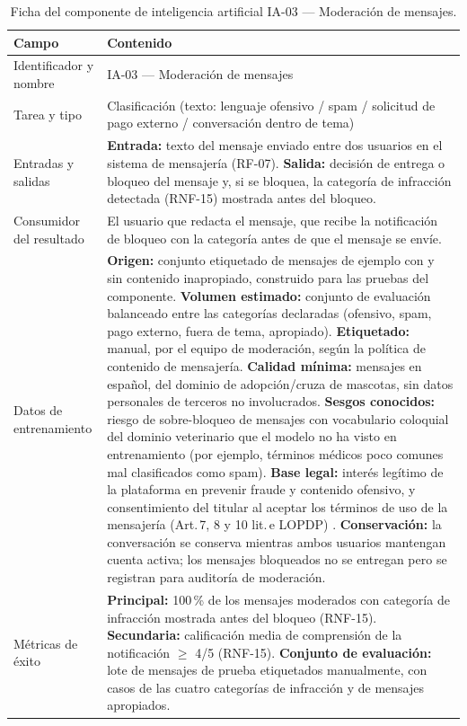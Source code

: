 \documentclass[journal,onecolumn]{IEEEtran}
\begin{document}
\begin{table}[H]
	\caption{Ficha del componente de inteligencia artificial IA-03 --- Moderación de mensajes.}
	\label{tab:ficha_ia03}
	\small
	\begin{tabularx}{\textwidth}{|L{4.2cm}|X|}
		\hline
		\textbf{Campo} & \textbf{Contenido} \\
		\hline
		Identificador y nombre & IA-03 --- Moderación de mensajes \\
		\hline
		Tarea y tipo & Clasificación (texto: lenguaje ofensivo / spam / solicitud de pago externo / conversación dentro de tema) \\
		\hline
		Entradas y salidas & \textbf{Entrada:} texto del mensaje enviado entre dos usuarios en el sistema de mensajería (RF-07). \textbf{Salida:} decisión de entrega o bloqueo del mensaje y, si se bloquea, la categoría de infracción detectada (RNF-15) mostrada antes del bloqueo. \\
		\hline
		Consumidor del resultado & El usuario que redacta el mensaje, que recibe la notificación de bloqueo con la categoría antes de que el mensaje se envíe. \\
		\hline
		Datos de entrenamiento & \textbf{Origen:} conjunto etiquetado de mensajes de ejemplo con y sin contenido inapropiado, construido para las pruebas del componente. \textbf{Volumen estimado:} conjunto de evaluación balanceado entre las categorías declaradas (ofensivo, spam, pago externo, fuera de tema, apropiado). \textbf{Etiquetado:} manual, por el equipo de moderación, según la política de contenido de mensajería. \textbf{Calidad mínima:} mensajes en español, del dominio de adopción/cruza de mascotas, sin datos personales de terceros no involucrados. \textbf{Sesgos conocidos:} riesgo de sobre-bloqueo de mensajes con vocabulario coloquial del dominio veterinario que el modelo no ha visto en entrenamiento (por ejemplo, términos médicos poco comunes mal clasificados como spam). \textbf{Base legal:} interés legítimo de la plataforma en prevenir fraude y contenido ofensivo, y consentimiento del titular al aceptar los términos de uso de la mensajería (Art.\,7, 8 y 10 lit.\,e LOPDP) \cite{lopdp2021}. \textbf{Conservación:} la conversación se conserva mientras ambos usuarios mantengan cuenta activa; los mensajes bloqueados no se entregan pero se registran para auditoría de moderación. \\
		\hline
		Métricas de éxito & \textbf{Principal:} 100\,\% de los mensajes moderados con categoría de infracción mostrada antes del bloqueo (RNF-15). \textbf{Secundaria:} calificación media de comprensión de la notificación $\geq$ 4/5 (RNF-15). \textbf{Conjunto de evaluación:} lote de mensajes de prueba etiquetados manualmente, con casos de las cuatro categorías de infracción y de mensajes apropiados. \\

\end{tabularx}
\end{table}
\end{document}
